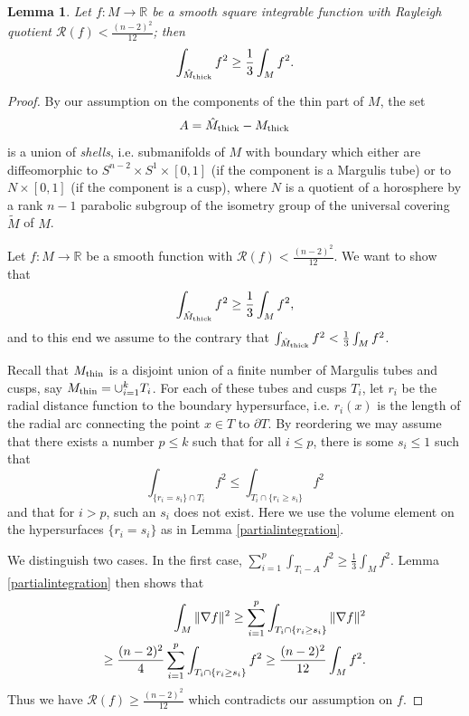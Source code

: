 \documentclass[11pt]{amsart}
\theoremstyle{plain}
\theoremstyle{plain}
\newtheorem{lemma}[theorem]{Lemma}
\theoremstyle{definition}
\newcommand{\cal}{\mathcal}
\begin{document}
 
\begin{lemma}\label{rayleigh}
Let $f:M\to \mathbb{R}$
be a smooth square integrable function with
Rayleigh quotient ${\cal R}(f)<  \frac{(n-2)^2}{12}$; then 
\[\int_{\hat M_{\rm thick}}f^2\geq \frac{1}{3}\int_M f^2.\]
\end{lemma}
\begin{proof}
By our assumption on the components of the thin part of $M$, the set
\[A=\hat M_{\rm thick}-M_{\rm thick}\]  is a union of \emph{shells},
i.e. submanifolds of $M$ with boundary which either are
diffeomorphic to $S^{n-2}\times S^1\times [0,1]$
(if the component is a Margulis tube) or to 
$N\times [0,1]$ (if the component is a cusp),
where
$N$ is a quotient of a horosphere by a rank
$n-1$ parabolic subgroup of the isometry group of 
the universal covering $\tilde M$ of $M$. 


Let $f:M\to \mathbb{R}$ be a smooth function with 
${\cal R}(f)<\frac{(n-2)^2}{12}$. We want to show that
\begin{equation}\label{integral}
\int_{\hat M_{\rm thick}}f^2\geq 
\frac{1}{3}\int_M f^2,\notag\end{equation} 
and to this end we assume to the contrary 
that $\int_{\hat M_{\rm thick}}f^2<
\frac{1}{3}\int_M f^2$.

Recall that $M_{\rm thin}$ is a disjoint union 
of a finite number of 
Margulis tubes and cusps, say 
$M_{\rm thin}=\cup_{i=1}^kT_i$.
For each of these tubes and cusps $T_i$, let $r_i$ be the radial distance
function to the boundary hypersurface, i.e. $r_i(x)$ is 
the length of the radial arc
connecting the point $x\in T$ to $\partial T$. By reordering we may assume that 
there exists a number $p\leq k$ such that 
for all $i\leq p$, there is some 
$s_i\leq 1$ such that
\[\int_{\{r_i=s_i\}\cap T_i}f^2\leq \int_{T_i\cap \{r_i\geq s_i\}}f^2\]
and that for $i>p$, such an $s_i$ does not exist.
Here we use the volume element on the hypersurfaces
$\{r_i=s_i\}$ as in Lemma \ref{partialintegration}. 

We distinguish two cases. In the first case,
$\sum_{i=1}^p\int_{T_i-A}f^2\geq \frac{1}{3}\int_Mf^2$.
Lemma \ref{partialintegration} then shows that
\begin{align}
\int_M\Vert \nabla f\Vert^2\geq 
\sum_{i=1}^p\int_{T_i\cap \{r_i\geq s_i\}}\Vert \nabla f\Vert^2 \notag \\
\geq \frac{(n-2)^2}{4}
\sum_{i=1}^p\int_{T_i\cap \{r_i\geq s_i\}}f^2\geq 
\frac{(n-2)^2}{12}\int_M f^2.\notag\end{align}
Thus we have
${\mathcal R}(f)\geq \frac{(n-2)^2}{12}$ 
which contradicts our assumption on $f$.


\end{proof}
\end{document}
